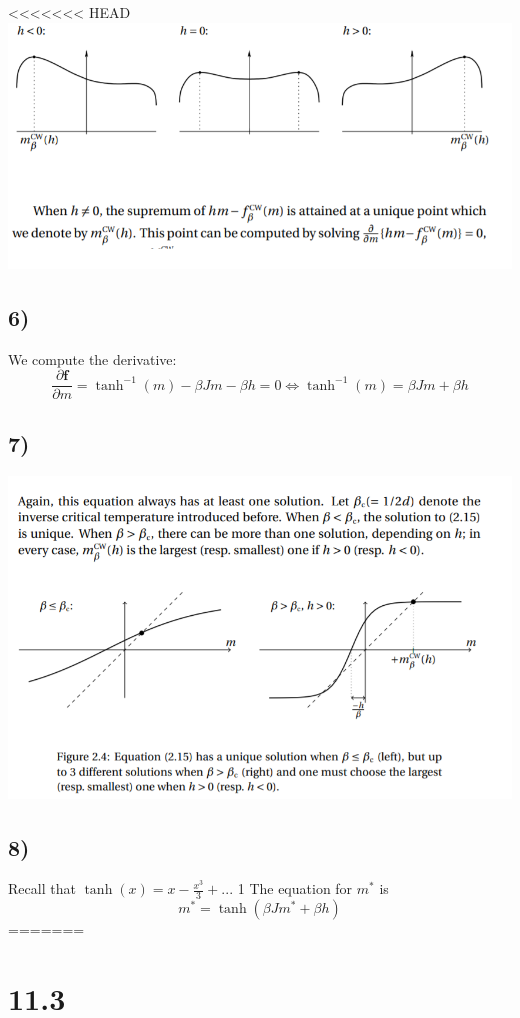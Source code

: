\documentclass[10pt,a4paper]{book}
\newcommand{\p}{\partial}
\begin{document}
<<<<<<< HEAD
\includegraphics[scale=0.5]{TD4}

\subsection*{6)}
We compute the derivative:
$$\frac{\p\mathbf{f}}{\p m}=\tanh^{-1}(m)-\beta Jm-\beta h=0\Leftrightarrow \tanh^{-1}(m)=\beta Jm+\beta h$$

\subsection*{7)}
\includegraphics[scale=0.5]{TD2}

\subsection*{8)}
Recall that $\tanh(x)=x-\frac{x^3}{3}+..$. 1
The equation for $m^*$ is 
$$m^*=\tanh(\beta Jm^*+\beta h)$$
=======
\section*{11.3}
\end{document}
